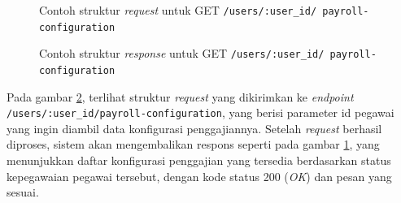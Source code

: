 \begin{figure}
    \centering
    \caption{Contoh struktur \textit{request} untuk GET \texttt{/users/{:user\_id}/ payroll-configuration}}
    \label{fig:response_payroll_configuration_by_user_id_get}
\end{figure}
\begin{figure}
    \centering
    \caption{Contoh struktur \textit{response} untuk GET \texttt{/users/{:user\_id}/ payroll-configuration}}
    \label{fig:request_payroll_configuration_by_user_id_get}
\end{figure}
Pada gambar \ref{fig:request_payroll_configuration_by_user_id_get}, terlihat struktur \textit{request} yang dikirimkan ke \textit{endpoint} \texttt{/users/{:user\_id}/payroll-configuration}, yang berisi parameter id pegawai yang ingin diambil data konfigurasi penggajiannya. Setelah \textit{request} berhasil diproses, sistem akan mengembalikan respons seperti pada gambar \ref{fig:response_payroll_configuration_by_user_id_get}, yang menunjukkan daftar konfigurasi penggajian yang tersedia berdasarkan status kepegawaian pegawai tersebut, dengan kode status 200 (\textit{OK}) dan pesan yang sesuai.



